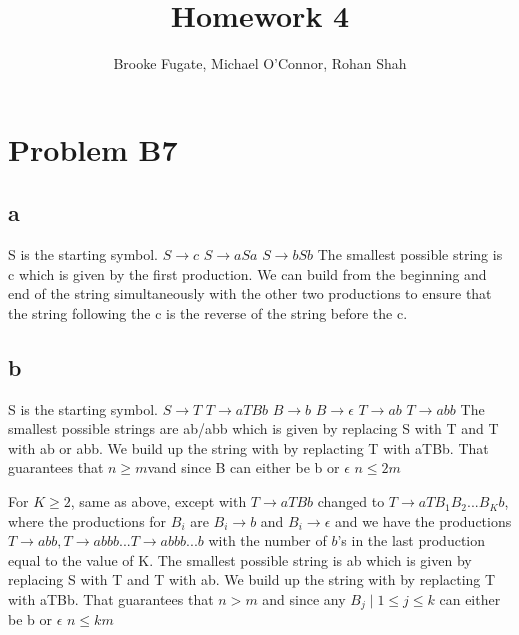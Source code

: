 \documentclass[12pt]{article}
\begin{document}
\pagestyle{plain}
\titleformat{\subsection}[runin]
  {\normalfont\large\bfseries}{\thesubsection}{1em}{}

\title{Homework 4}
\author{Brooke Fugate, Michael O'Connor, Rohan Shah}
\date{}

\maketitle

\section*{Problem B7}
\subsection*{a} S is the starting symbol. \newline
$S \rightarrow c$ \newline
$S \rightarrow aSa$ \newline
$S \rightarrow bSb$ \newline
The smallest possible string is c which is given by the first production. We can build from the beginning and end of the string simultaneously with the other two productions to ensure that the string following the c is the reverse of the string before the c.
\subsection*{b} S is the starting symbol. \newline
$S \rightarrow T$ \newline
$T \rightarrow aTBb$ \newline
$B \rightarrow b$ \newline
$B \rightarrow \epsilon$ \newline
$T \rightarrow ab$ \newline
$T \rightarrow abb$ \newline
The smallest possible strings are ab/abb which is given by replacing S with T and T with ab or abb. We build up the string with by replacting T with aTBb. That guarantees that $n \ge m$vand since B can either be b or $\epsilon$ $n \le 2m$\newline

For $K \ge 2$, same as above, except with $T \rightarrow aTBb$ changed to $T \rightarrow aTB_1B_2...B_Kb$, where the productions for $B_i$ are $B_i \rightarrow b$ and $B_i \rightarrow \epsilon$ and we have the productions $T \rightarrow abb, T \rightarrow abbb ... T \rightarrow abbb...b$ with the number of $b$'s in the last production equal to the value of K. \newline
The smallest possible string is ab which is given by replacing S with T and T with ab. We build up the string with by replacting T with aTBb.  That guarantees that $n > m$ and since any $B_j \mid 1 \le j \le k$ can either be b or $\epsilon$ $n \le km$
\end{document}

